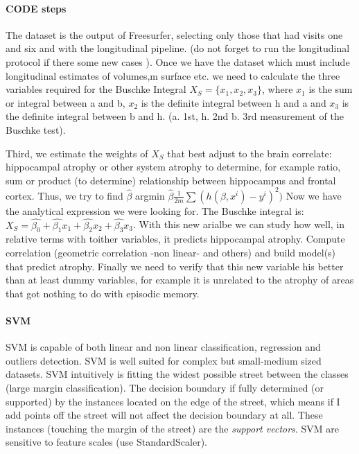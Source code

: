 \documentclass[9pt,twocolumn,twoside]{pnas-new}
\begin{document}
\paragraph*{CODE steps}
The dataset is the output of Freesurfer, selecting only those that had visits one and six and with the longitudinal pipeline. (do not forget to run the longitudinal protocol if there some new cases ).
Once we have the dataset which must include longitudinal estimates of volumes,m surface etc. we need to calculate the three variables required for the Buschke Integral $X_S = \{x_1, x_2,x_3\}$, where $x_1$ is the sum or integral between a and b, $x_2$ is the definite integral between h and a and $x_3$ is the definite integral between b and h. (a. 1st, h. 2nd b. 3rd measurement of the Buschke test).

Third, we estimate the weights of $X_S$ that best adjust to the brain correlate: hippocampal atrophy or other system atrophy to determine, for example ratio, sum or product (to determine) relationship between hippocampus and frontal cortex. 
Thus, we try to find $\hat{\beta}$ argmin $ \hat{\beta} \frac{1}{2m} \sum (h(\beta, x^i) - y^i)^2)$ 
Now we have the analytical expression we were looking for. The Buschke integral is: 
$X_S =  \hat{\beta_0} + \hat{\beta_1}x_1 + \hat{\beta_2}x_2 + \hat{\beta_3}x_3$.
With this new arialbe we can study how well, in relative terms with toither variables, it predicts hippocampal atrophy. Compute correlation (geometric correlation -non linear- and others) and build model(s) that predict atrophy. Finally we need to verify that this new variable his better than at least dummy variables, for example it is unrelated to the atrophy of areas that got nothing to do with episodic memory.

\paragraph*{SVM}
SVM is capable of both linear and non linear classification, regression and outliers detection. SVM is well suited for complex but small-medium sized datasets.
SVM intuitively is fitting the widest possible street between the classes (large margin classification). 
The decision boundary if fully determined (or supported) by the instances located on the edge of the street, which means if I add points off the street will not affect the decision boundary at all.
These instances (touching the margin of the street) are the \emph{support vectors}. SVM are sensitive to feature scales (use StandardScaler).
\end{document}
